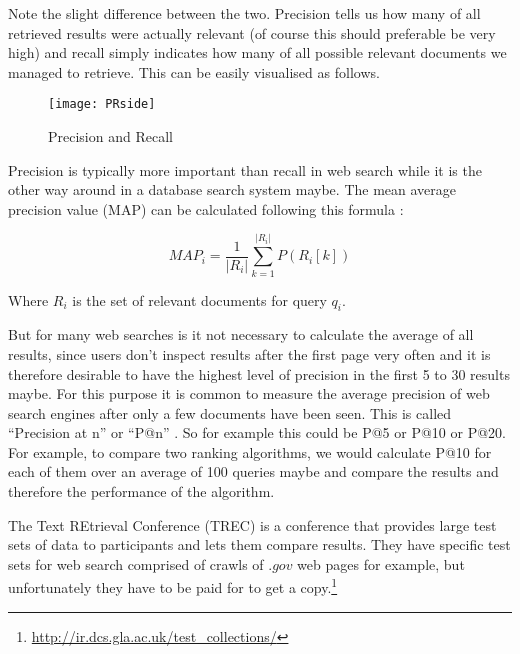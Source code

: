 Note the slight difference between the two. Precision tells us how many of all retrieved results were actually relevant (of course this should preferable be very high) and recall simply indicates how many of all possible relevant documents we managed to retrieve. This can be easily visualised as follows.

%   

\begin{figure}[htbp]
  \centering
  \texttt{[image: PRside]}
  \caption[Precision and Recall]{Precision and Recall\footnotemark}
\label{fig:PR}
\end{figure}

Precision is typically more important than recall in web search while it is the other way around in a database search system maybe. The mean average precision value (MAP) can be calculated following this formula \autocite[p.141]{Baeza-Yates2011}:

\begin{equation}
  MAP_i = \frac{1}{|R_i|} \sum_{k=1}^{|R_i|} P(R_i[k])
\label{eq:MAP}
\end{equation}

Where $R_i$ is the set of relevant documents for query $q_i$.

But for many web searches is it not necessary to calculate the average of all results, since users don't inspect results after the first page very often and it is therefore desirable to have the highest level of precision in the first 5 to 30 results maybe. For this purpose it is common to measure the average precision of web search engines after only a few documents have been seen. This is called ``Precision at n'' or ``P@n'' \autocite[p.140]{Baeza-Yates2011}. So for example this could be P@5 or P@10 or P@20. For example, to compare two ranking algorithms, we would calculate P@10 for each of them over an average of 100 queries maybe and compare the results and therefore the performance of the algorithm.

The Text REtrieval Conference (TREC) is a conference that provides large test sets of data to participants and lets them compare results. They have specific test sets for web search comprised of crawls of $.gov$ web pages for example, but unfortunately they have to be paid for to get a copy.\footnote{\url{http://ir.dcs.gla.ac.uk/test_collections/}}%

